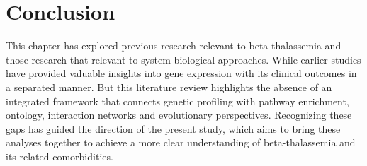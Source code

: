 \section{Conclusion}
\label{sec:sec2_4}

This chapter has explored previous research relevant to beta-thalassemia and those research that relevant to system biological approaches. While earlier studies have provided valuable insights into gene expression with its clinical outcomes in a separated manner. But this literature review highlights the absence of an integrated framework that connects genetic profiling with pathway enrichment, ontology, interaction networks and evolutionary perspectives. Recognizing these gaps has guided the direction of the present study, which aims to bring these analyses together to achieve a more clear understanding of beta-thalassemia and its related comorbidities.


